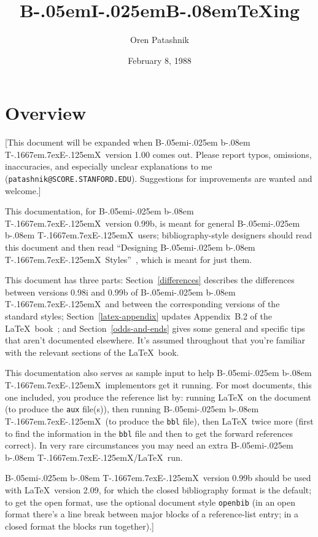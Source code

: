 
\def\symbol#1{\char #1\relax}
\def\bsl{{\tt\symbol{'134}}}
\def\BibTeX{{\rm B\kern-.05em{\sc i\kern-.025em b}\kern-.08em
    T\kern-.1667em\lower.7ex\hbox{E}\kern-.125emX}}

\title{B\kern-.05em{\large I}\kern-.025em{\large B}\kern-.08em\TeX ing}
\author{Oren Patashnik}
\date{February 8, 1988}



\maketitle

\section{Overview}

[This document will be expanded when \BibTeX\ version 1.00 comes out.
Please report typos, omissions, inaccuracies,
and especially unclear explanations
to me ({\tt patashnik@SCORE.STANFORD.EDU}).
Suggestions for improvements are wanted and welcome.]

This documentation, for \BibTeX\ version 0.99b,
is meant for general \BibTeX\ users;
bibliography-style designers should read this document
and then read ``Designing \BibTeX\ Styles''~\cite{btxhak},
which is meant for just them.

This document has three parts:
Section~\ref{differences}
describes the differences between versions 0.98i and 0.99b
of \BibTeX\ and between the corresponding versions of the standard styles;
Section~\ref{latex-appendix}
updates Appendix~B.2 of the \LaTeX\ book~\cite{latex};
and Section~\ref{odds-and-ends}
gives some general and specific tips
that aren't documented elsewhere.
It's assumed throughout that you're familiar with
the relevant sections of the \LaTeX\ book.

This documentation also serves as sample input to help
\BibTeX\ implementors get it running.
For most documents, this one included, you produce the reference list by:
running \LaTeX\ on the document (to produce the {\tt aux} file(s)),
then running \BibTeX\ (to produce the {\tt bbl} file),
then \LaTeX\ twice more (first to find the information in the {\tt bbl} file
and then to get the forward references correct).
In very rare circumstances you may need an extra \BibTeX/\LaTeX\ run.

\BibTeX\ version 0.99b should be used with \LaTeX\ version 2.09,
for which the closed bibliography format is the default;
to get the open format, use the optional document style {\tt openbib}
(in an open format there's a line break between major blocks of a
reference-list entry; in a closed format the blocks run together).]

